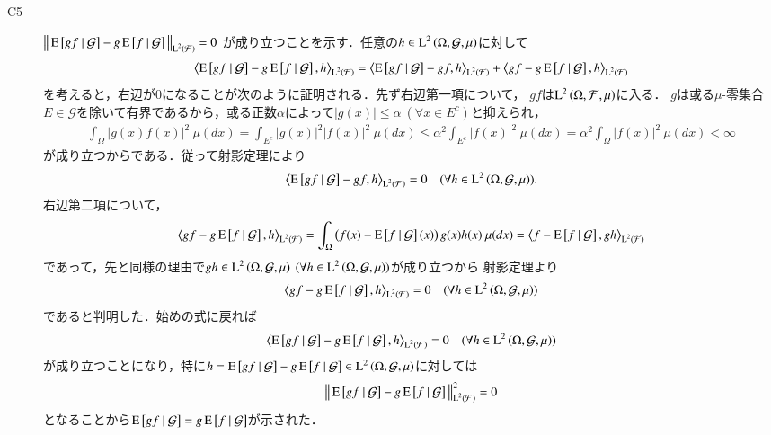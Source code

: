 \begin{prf}
\begin{description}
			\item[C5] $\left\|\, \operatorname{E} \left[ gf \ \middle|\ \mathcal{G} \right] - g\operatorname{E} \left[ f \ \middle|\ \mathcal{G} \right]\, \right\|_{\operatorname{L}^{2} \left(\mathcal{F}\right)} = 0$
				が成り立つことを示す．任意の$h \in \operatorname{L}^{2} \left(\Omega, \mathcal{G},\mu\right)$に対して
				\begin{align}
					\inprod<\cexp{gf}{\mathcal{G}} - g\cexp{f}{\mathcal{G}}, h>_{\Lp{2}{\mathcal{F}}} 
					= \inprod<\cexp{gf}{\mathcal{G}} - gf, h>_{\Lp{2}{\mathcal{F}}} + \inprod<gf - g\cexp{f}{\mathcal{G}}, h>_{\Lp{2}{\mathcal{F}}}
				\end{align}
				を考えると，右辺が0になることが次のように証明される．先ず右辺第一項について，
				$gf$は$\operatorname{L}^{2} \left(\Omega, \mathcal{F},\mu\right)$に入る．
				$g$は或る$\mu$-零集合$E \in \mathcal{G}$を除いて有界であるから，或る正数$\alpha$によって$|g(x)| \leq \alpha \ (\forall x \in E^c)$と抑えられ，
				\begin{align}
					\int_{\Omega} |g(x)f(x)|^2\ \mu(dx) = \int_{E^c} |g(x)|^2|f(x)|^2\ \mu(dx) \leq \alpha^2 \int_{E^c} |f(x)|^2\ \mu(dx) = \alpha^2 \int_{\Omega} |f(x)|^2\ \mu(dx) < \infty
				\end{align}
				が成り立つからである．従って射影定理により
				\begin{align}
					\inprod<\cexp{gf}{\mathcal{G}} - gf, h>_{\Lp{2}{\mathcal{F}}} = 0 \quad (\forall h \in \Lp{2}{\Omega, \mathcal{G},\mu}).
				\end{align}
				右辺第二項について，
				\begin{align}
					\inprod<gf - g\cexp{f}{\mathcal{G}}, h>_{\Lp{2}{\mathcal{F}}} = \int_{\Omega} \left( f(x) - \cexp{f}{\mathcal{G}}(x) \right) g(x)h(x)\ \mu(dx)
					= \inprod<f - \cexp{f}{\mathcal{G}}, gh>_{\Lp{2}{\mathcal{F}}}
				\end{align}
				であって，先と同様の理由で$gh \in \operatorname{L}^{2} \left(\Omega, \mathcal{G},\mu\right) \ (\forall h \in \operatorname{L}^{2} \left(\Omega, \mathcal{G},\mu\right))$が成り立つから
				射影定理より
				\begin{align}
					\inprod<gf - g\cexp{f}{\mathcal{G}}, h>_{\Lp{2}{\mathcal{F}}} = 0  \quad (\forall h \in \Lp{2}{\Omega, \mathcal{G},\mu})
				\end{align}
				であると判明した．始めの式に戻れば
				\begin{align}
					\inprod<\cexp{gf}{\mathcal{G}} - g\cexp{f}{\mathcal{G}}, h>_{\Lp{2}{\mathcal{F}}} = 0  \quad (\forall h \in \Lp{2}{\Omega, \mathcal{G},\mu})
				\end{align}
				が成り立つことになり，特に$h = \operatorname{E} \left[ gf \ \middle|\ \mathcal{G} \right] - g\operatorname{E} \left[ f \ \middle|\ \mathcal{G} \right] \in \operatorname{L}^{2} \left(\Omega, \mathcal{G},\mu\right)$に対しては
				\begin{align}
					\left\|\, \operatorname{E} \left[ gf \ \middle|\ \mathcal{G} \right] - g\operatorname{E} \left[ f \ \middle|\ \mathcal{G} \right]\, \right\|_{\operatorname{L}^{2} \left(\mathcal{F}\right)}^2 = 0
				\end{align}
				となることから$\operatorname{E} \left[ gf \ \middle|\ \mathcal{G} \right] = g\operatorname{E} \left[ f \ \middle|\ \mathcal{G} \right]$が示された．
			

\end{description}
\end{prf}
